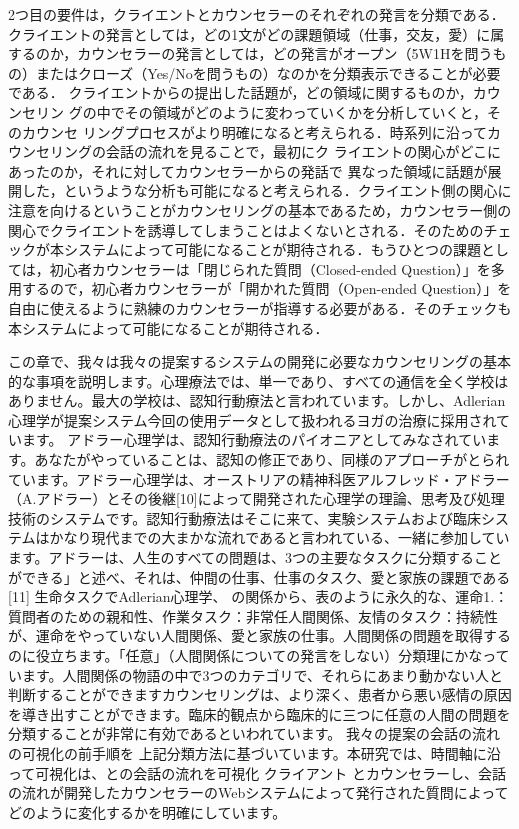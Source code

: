 \documentclass[shuuron]{kuee}
\begin{document}
2つ目の要件は，クライエントとカウンセラーのそれぞれの発言を分類である．クライエントの発言としては，どの1文がどの課題領域（仕事，交友，愛）に属するのか，カウンセラーの発言としては，どの発言がオープン（5W1Hを問うもの）またはクローズ（Yes/Noを問うもの）なのかを分類表示できることが必要である．
クライエントからの提出した話題が，どの領域に関するものか，カウンセリン
グの中でその領域がどのように変わっていくかを分析していくと，そのカウンセ
リングプロセスがより明確になると考えられる．時系列に沿ってカウンセリングの会話の流れを見ることで，最初にク
ライエントの関心がどこにあったのか，それに対してカウンセラーからの発話で
異なった領域に話題が展開した，というような分析も可能になると考えられる．クライエント側の関心に注意を向けるということがカウンセリングの基本であるため，カウンセラー側の関心でクライエントを誘導してしまうことはよくないとされる．そのためのチェックが本システムによって可能になることが期待される．もうひとつの課題としては，初心者カウンセラーは「閉じられた質問（Closed-ended Question）」を多用するので，初心者カウンセラーが「開かれた質問（Open-ended Question）」を自由に使えるように熟練のカウンセラーが指導する必要がある．そのチェックも本システムによって可能になることが期待される．



 この章で、我々は我々の提案するシステムの開発に必要なカウンセリングの基本的な事項を説明します。心理療法では、単一であり、すべての通信を全く学校はありません。最大の学校は、認知行動療法と言われています。しかし、Adlerian心理学が提案システム今回の使用データとして扱われるヨガの治療に採用されています。
アドラー心理学は、認知行動療法のパイオニアとしてみなされています。あなたがやっていることは、認知の修正であり、同様のアプローチがとられています。アドラー心理学は、オーストリアの精神科医アルフレッド・アドラー（A.アドラー）とその後継[10]によって開発された心理学の理論、思考及び処理技術のシステムです。認知行動療法はそこに来て、実験システムおよび臨床システムはかなり現代までの大まかな流れであると言われている、一緒に参加しています。アドラーは、人生のすべての問題は、3つの主要なタスクに分類することができる」と述べ、それは、仲間の仕事、仕事のタスク、愛と家族の課題である[11] 生命タスクでAdlerian心理学、 の関係から、表のように永久的な、運命1.：質問者のための親和性、作業タスク：非常任人間関係、友情のタスク：持続性が、運命をやっていない人間関係、愛と家族の仕事。人間関係の問題を取得するのに役立ちます。「任意」（人間関係についての発言をしない）分類理にかなっています。人間関係の物語の中で3つのカテゴリで、それらにあまり動かない人と判断することができますカウンセリングは、より深く、患者から悪い感情の原因を導き出すことができます。臨床的観点から臨床的に三つに任意の人間の問題を分類することが非常に有効であるといわれています。
我々の提案の会話の流れの可視化の前手順を 上記分類方法に基づいています。本研究では、時間軸に沿って可視化は、との会話の流れを可視化 クライアント とカウンセラーし、会話の流れが開発したカウンセラーのWebシステムによって発行された質問によってどのように変化するかを明確にしています。
\end{document}
